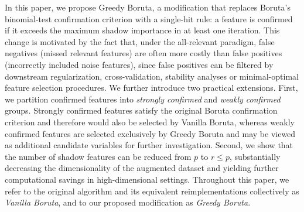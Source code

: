 \documentclass[runningheads]{llncs}
\begin{document}
In this paper, we propose Greedy Boruta, a modification that replaces Boruta's binomial-test confirmation criterion with a single-hit rule: a feature is confirmed if it exceeds the maximum shadow importance in at least one iteration. This change is motivated by the fact that, under the all-relevant paradigm, false negatives (missed relevant features) are often more costly than false positives (incorrectly included noise features), since false positives can be filtered by downstream regularization, cross-validation, stability analyses or minimal-optimal feature selection procedures. We further introduce two practical extensions. First, we partition confirmed features into \emph{strongly confirmed} and \emph{weakly confirmed} groups. Strongly confirmed features satisfy the original Boruta confirmation criterion and therefore would also be selected by Vanilla Boruta, whereas weakly confirmed features are selected exclusively by Greedy Boruta and may be viewed as additional candidate variables for further investigation. Second, we show that the number of shadow features can be reduced from $p$ to $r \leq p$, substantially decreasing the dimensionality of the augmented dataset and yielding further computational savings in high-dimensional settings. Throughout this paper, we refer to the original algorithm and its equivalent reimplementations collectively as \emph{Vanilla Boruta}, and to our proposed modification as \emph{Greedy Boruta}.
\end{document}
